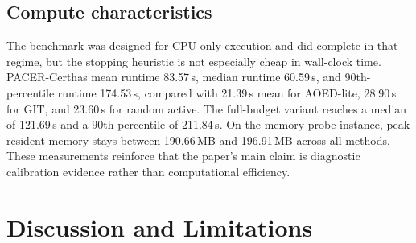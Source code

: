 \documentclass{article}
\newcommand{\method}{PACER-Cert}
\newcommand{\qe}{q_e}
\begin{document}
\begin{table}[t]
\caption{Calibration summary for the local resolvability surrogate and edge-level stopping score. ``Overall $D$'' uses all 285 calibration tuples. The $\qe$ rows use the 38 oracle stopping-label rows. Higher is better for AUROC, AUPRC, and Spearman; lower is better for Brier, ECE$_{10}$, and MACE.}
\label{tab:calibration}
\centering
\small
{}
\end{table}

\subsection{Compute characteristics}

The benchmark was designed for CPU-only execution and did complete in that regime, but the stopping heuristic is not especially cheap in wall-clock time. \method has mean runtime 83.57\,s, median runtime 60.59\,s, and 90th-percentile runtime 174.53\,s, compared with 21.39\,s mean for AOED-lite, 28.90\,s for GIT, and 23.60\,s for random active. The full-budget variant reaches a median of 121.69\,s and a 90th percentile of 211.84\,s. On the memory-probe instance, peak resident memory stays between 190.66\,MB and 196.91\,MB across all methods. These measurements reinforce that the paper's main claim is diagnostic calibration evidence rather than computational efficiency.

\section{Discussion and Limitations}
\label{sec:discussion}
\end{document}
